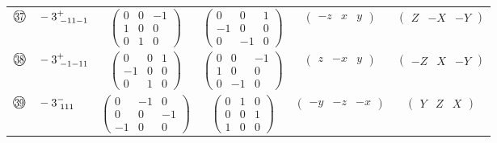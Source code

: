 \documentclass[fleqn,10pt,landscape]{jsarticle}
\begin{document}
\begin{center}
\begin{longtable}{lcccc}
$ {\ooalign{\hfil\resizebox{.8\width}{\height}{37}\hfil\crcr\raise.1ex\hbox{\large$\bigcirc$}}}\quad -3^{+}_{\,\,-11-1} $ & $ \begin{pmatrix} 0 & 0 & -1 \\ 1 & 0 & 0 \\ 0 & 1 & 0 \end{pmatrix} $ & $ \begin{pmatrix} 0 & 0 & 1 \\ -1 & 0 & 0 \\ 0 & -1 & 0 \end{pmatrix} $ & $ \begin{pmatrix} - z & x & y \end{pmatrix} $ & $ \begin{pmatrix} Z & - X & - Y \end{pmatrix} $ \\
$ {\ooalign{\hfil\resizebox{.8\width}{\height}{38}\hfil\crcr\raise.1ex\hbox{\large$\bigcirc$}}}\quad -3^{+}_{\,\,-1-11} $ & $ \begin{pmatrix} 0 & 0 & 1 \\ -1 & 0 & 0 \\ 0 & 1 & 0 \end{pmatrix} $ & $ \begin{pmatrix} 0 & 0 & -1 \\ 1 & 0 & 0 \\ 0 & -1 & 0 \end{pmatrix} $ & $ \begin{pmatrix} z & - x & y \end{pmatrix} $ & $ \begin{pmatrix} - Z & X & - Y \end{pmatrix} $ \\
$ {\ooalign{\hfil\resizebox{.8\width}{\height}{39}\hfil\crcr\raise.1ex\hbox{\large$\bigcirc$}}}\quad -3^{-}_{\,\,111} $ & $ \begin{pmatrix} 0 & -1 & 0 \\ 0 & 0 & -1 \\ -1 & 0 & 0 \end{pmatrix} $ & $ \begin{pmatrix} 0 & 1 & 0 \\ 0 & 0 & 1 \\ 1 & 0 & 0 \end{pmatrix} $ & $ \begin{pmatrix} - y & - z & - x \end{pmatrix} $ & $ \begin{pmatrix} Y & Z & X \end{pmatrix} $ \\

\end{longtable}
\end{center}
\end{document}
